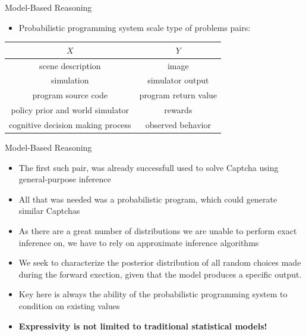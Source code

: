 \documentclass[AERbeamer%
              ,optEnglish%
              ,optBiber%
              ,optBibstyleAlphabetic%
              ,optBeamerClassicFormat%
              ]{AERlatex}%
\begin{document}
\begin{frame}[c]{Model-Based Reasoning}
    \centering
    \begin{itemize}
        \item Probabilistic programming system scale type of problems pairs:
    \end{itemize}
    \vspace{1cm}
    \begin{center}
        \begin{tabular}{|c|c|}
            \hline
            $X$ & $Y$ \\
            \hline
            scene description & image \\
            simulation & simulator output \\
            program source code & program return value \\
            policy prior and world simulator & rewards \\
            cognitive decision making process & observed behavior \\
            \hline
        \end{tabular}
    \end{center}
\end{frame}


\begin{frame}[c]{Model-Based Reasoning}
    \centering
    \begin{itemize}
        \item The first such pair, was already successfull used to solve Captcha using general-purpose inference
        \item All that was needed was a probabilistic program, which could generate similar Captchas
        \item As there are a great number of distributions we are unable to perform exact inference on, we have to
              rely on approximate inference algorithms
        \item We seek to characterize the posterior distribution of all random choices made during the forward exection,
              given that the model produces a specific output.
        \item Key here is always the ability of the probabilistic programming system to condition on existing values
        \item \textbf{Expressivity is not limited to traditional statistical models!}
    \end{itemize}
\end{frame}
\end{document}
